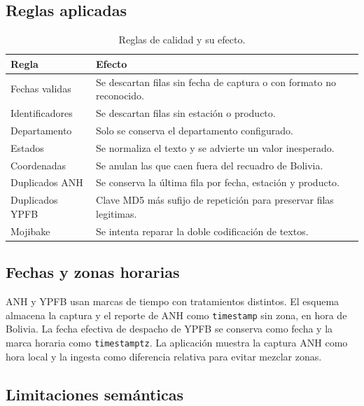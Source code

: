 \documentclass[12pt,a4paper]{article}
\begin{document}
\subsection{Reglas aplicadas}

\begin{table}[H]
\centering
\small
\caption{Reglas de calidad y su efecto.}
\label{tab:calidad}
\begin{tabularx}{\linewidth}{@{}l X@{}}
\toprule
\textbf{Regla} & \textbf{Efecto} \\
\midrule
Fechas validas & Se descartan filas sin fecha de captura o con formato no reconocido. \\
Identificadores & Se descartan filas sin estación o producto. \\
Departamento & Solo se conserva el departamento configurado. \\
Estados & Se normaliza el texto y se advierte un valor inesperado. \\
Coordenadas & Se anulan las que caen fuera del recuadro de Bolivia. \\
Duplicados ANH & Se conserva la última fila por fecha, estación y producto. \\
Duplicados YPFB & Clave MD5 más sufijo de repetición para preservar filas legitimas. \\
Mojibake & Se intenta reparar la doble codificación de textos. \\
\bottomrule
\end{tabularx}
\end{table}

\subsection{Fechas y zonas horarias}

ANH y YPFB usan marcas de tiempo con tratamientos distintos. El esquema almacena la captura y el reporte de ANH como \texttt{timestamp} sin zona, en hora de Bolivia. La fecha efectiva de despacho de YPFB se conserva como fecha y la marca horaria como \texttt{timestamptz}. La aplicación muestra la captura ANH como hora local y la ingesta como diferencia relativa para evitar mezclar zonas.

\subsection{Limitaciones semánticas}
\end{document}

